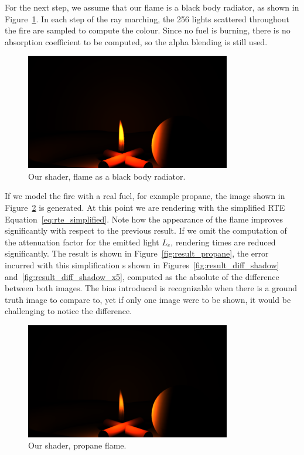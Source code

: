 For the next step, we assume that our flame is a black body radiator, as shown in Figure~\ref{fig:result_blackbody}.
In each step of the ray marching, the 256 lights scattered throughout the fire are sampled to compute the colour.
Since no fuel is burning, there is no absorption coefficient to be computed, so the alpha blending is still used.

\begin{figure}[htbp]
	\centering
	\includegraphics[width=0.8\textwidth, trim={8cm 0 8cm 10cm}, clip]{img/result_blackbody}
	\caption{Our shader, flame as a black body radiator.}
	\label{fig:result_blackbody}
\end{figure}

If we model the fire with a real fuel, for example propane, the image shown in Figure~\ref{fig:result_propane_shadows} is generated.
At this point we are rendering with the simplified RTE Equation~\ref{eq:rte_simplified}.
Note how the appearance of the flame improves significantly with respect to the previous result.
If we omit the computation of the attenuation factor for the emitted light $L_e$, rendering times are reduced significantly.
The result is shown in Figure~\ref{fig:result_propane}, the error incurred with this simplification s shown in Figures~\ref{fig:result_diff_shadow} and~\ref{fig:result_diff_shadow_x5}, computed as the absolute of the difference between both images.
The bias introduced is recognizable when there is a ground truth image to compare to, yet if only one image were to be shown, it would be challenging to notice the difference. 

\begin{figure}[htbp]
	\centering
	\includegraphics[width=0.8\textwidth, trim={8cm 0 8cm 10cm}, clip]{img/result_propane_shadows}
	\caption{Our shader, propane flame.}
	\label{fig:result_propane_shadows}
\end{figure}

